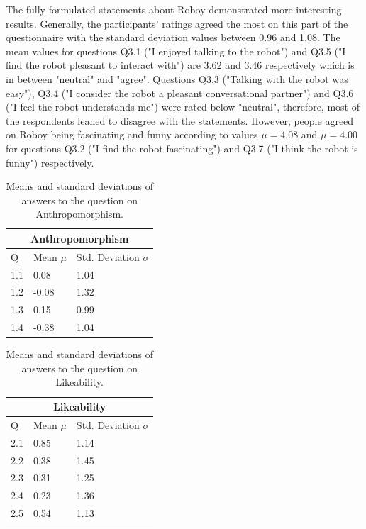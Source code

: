 The fully formulated statements about Roboy demonstrated more interesting results. Generally, the participants' ratings agreed the most on this part of the questionnaire with the standard deviation values between 0.96 and 1.08. The mean values for questions Q3.1 ("I enjoyed talking to the robot") and Q3.5 ("I find the robot pleasant to interact with") are 3.62 and 3.46 respectively which is in between "neutral" and "agree". Questions Q3.3 ("Talking with the robot was easy"), Q3.4 ("I consider the robot a pleasant conversational partner") and Q3.6 ("I feel the robot understands me") were rated below "neutral", therefore, most of the respondents leaned to disagree with the statements. However, people agreed on Roboy being fascinating and funny according to values \( \mu=4.08\) and \( \mu=4.00\) for questions Q3.2 ("I find the robot fascinating") and Q3.7 ("I think the robot is funny") respectively.

\begin{table}[htpb]
\centering
    \begin{tabular}{|l|l|l|}
    \hline
    \multicolumn{3}{|c|}{Anthropomorphism} \\ \hline
    Q  & Mean \( \mu\) & Std. Deviation \( \sigma\) \\ \hline
    1.1 & 0.08 & 1.04 \\ \hline
    1.2  & -0.08 & 1.32 \\ \hline
    1.3  & 0.15 & 0.99 \\ \hline
    1.4  & -0.38  & 1.04 \\ \hline
    \end{tabular}
\caption{Means and standard deviations of answers to the question on Anthropomorphism.}
\label{table:us1}
\end{table}

\begin{table}[htpb]
\centering
    \begin{tabular}{|l|l|l|}
    \hline
    \multicolumn{3}{|c|}{Likeability} \\ \hline
    Q   & Mean \( \mu\) & Std. Deviation \( \sigma\) \\ \hline
    2.1 & 0.85  & 1.14           \\ \hline
    2.2 & 0.38  & 1.45           \\ \hline
    2.3 & 0.31  & 1.25           \\ \hline
    2.4 & 0.23  & 1.36           \\ \hline
    2.5 & 0.54  & 1.13           \\ \hline
    \end{tabular}
\caption{Means and standard deviations of answers to the question on Likeability.}
\label{table:us2}
\end{table}


